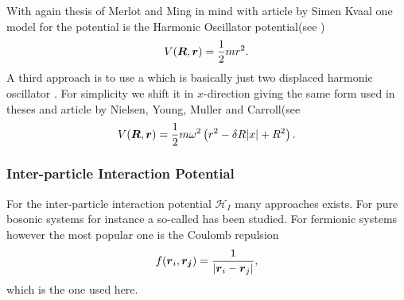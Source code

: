     With again thesis of Merlot and Ming in mind with article by Simen
    Kvaal\cite{kvaaldots} one model for the  potential is
    the Harmonic Oscillator potential(see )
        \begin{equation}
            V(\boldsymbol{{R}},\boldsymbol{{r}}) = \frac{1}{2}mr^2.
        \end{equation}
    A third approach is to use a  which is basically just two
    displaced harmonic oscillator \cite{ddotnuc,yangthesis}. For simplicity we
    shift it in $x$-direction giving the same form used in
    theses\cite{yangthesis, merlotthesis, jorgenThesis} and article by Nielsen,
    Young, Muller and Carroll\cite{nonIsoGauss}(see 
        \begin{equation}
            V(\boldsymbol{{R}},\boldsymbol{{r}}) = \frac{1}{2}m\omega^2\left(r^2 - \delta
            R\abs{x} + R^2\right).
        \end{equation}

\subsubsection{Inter-particle Interaction Potential}
    For the inter-particle interaction potential $\mathcal{H}_I$ many
    approaches exists. For pure bosonic systems for instance a so-called
     has been studied\cite{jastrow}. For fermionic
    systems however the most popular one is the Coulomb repulsion
        \begin{equation}
            f(\boldsymbol{{r}}_i,\boldsymbol{{r_j}}) = \frac{1}{\abs{\boldsymbol{{r}}_i - \boldsymbol{{r}}_j}},
        \end{equation}
    which is the one used here.

